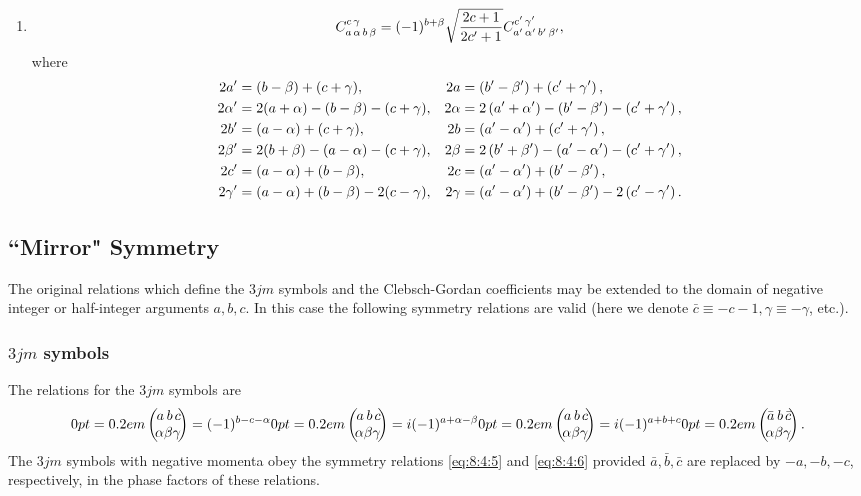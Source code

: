 \begin{enumerate}[label=(\roman*)]
\[\begin{aligned}
\end{aligned}
\]
\item
\begin{equation}
C_{a\,\alpha\,b\,\beta}^{c\,\gamma}=(-1)^{b+\beta} \sqrt{\frac{2 c+1}{2 c^{\prime}+1}} C_{a^{\prime}\,\alpha^{\prime}\,b^{\prime}\,\beta^{\prime}}^{c^{\prime}\,\gamma^{\prime}}, \label{eq:8:4:14}
\end{equation}
where
\begin{align}
2 a^{\prime} & =(b-\beta)+(c+\gamma), & 2 a & =\left(b^{\prime}-\beta^{\prime}\right)+\left(c^{\prime}+\gamma^{\prime}\right), \notag\\
2 \alpha^{\prime} & =2(a+\alpha)-(b-\beta)-(c+\gamma), & 2 \alpha & =2\left(a^{\prime}+\alpha^{\prime}\right)-\left(b^{\prime}-\beta^{\prime}\right)-\left(c^{\prime}+\gamma^{\prime}\right), \notag\\
2 b^{\prime} & =(a-\alpha)+(c+\gamma), & 2 b & =\left(a^{\prime}-\alpha^{\prime}\right)+\left(c^{\prime}+\gamma^{\prime}\right), \label{eq:8:4:15}\\
2 \beta^{\prime} & =2(b+\beta)-(a-\alpha)-(c+\gamma), & 2 \beta & =2\left(b^{\prime}+\beta^{\prime}\right)-\left(a^{\prime}-\alpha^{\prime}\right)-\left(c^{\prime}+\gamma^{\prime}\right), \notag\\
2 c^{\prime} & =(a-\alpha)+(b-\beta), & 2 c & =\left(a^{\prime}-\alpha^{\prime}\right)+\left(b^{\prime}-\beta^{\prime}\right), \notag\\
2 \gamma^{\prime} & =(a-\alpha)+(b-\beta)-2(c-\gamma), & 2 \gamma & =\left(a^{\prime}-\alpha^{\prime}\right)+\left(b^{\prime}-\beta^{\prime}\right)-2\left(c^{\prime}-\gamma^{\prime}\right) . \notag
\end{align}
\end{enumerate}
\subsection{``Mirror" Symmetry}\label{sec:8.4.4}
The original relations which define the $3 j m$ symbols and the Clebsch-Gordan coefficients may be extended to the domain of negative integer or half-integer arguments $a, b, c$. In this case the following symmetry relations are valid \cite{ref045} (here we denote $\bar{c} \equiv-c-1, \gamma \equiv-\gamma$, etc.).\\
\subsubsection{$3jm$ symbols}
The relations for the $3 j m$ symbols are
\begin{equation}
\threej{a}{b}{c}{\alpha}{\beta}{\gamma}\label{eq:8:4:16}=(-1)^{b-c-\alpha}\threej{a}{b}{c}{\alpha}{\beta}{\gamma}=i(-1)^{a+\alpha-\beta}\threej{a}{b}{c}{\alpha}{\beta}{\gamma}=i(-1)^{a+b+c}\threej{\bar{a}}{b}{\bar{c}}{\alpha}{\beta}{\gamma} .
\end{equation}
The $3 j m$ symbols with negative momenta obey the symmetry relations \eqref{eq:8:4:5} and \eqref{eq:8:4:6} provided $\bar{a}, \bar{b}, \bar{c}$ are replaced by $-a,-b,-c$, respectively, in the phase factors of these relations.\\
